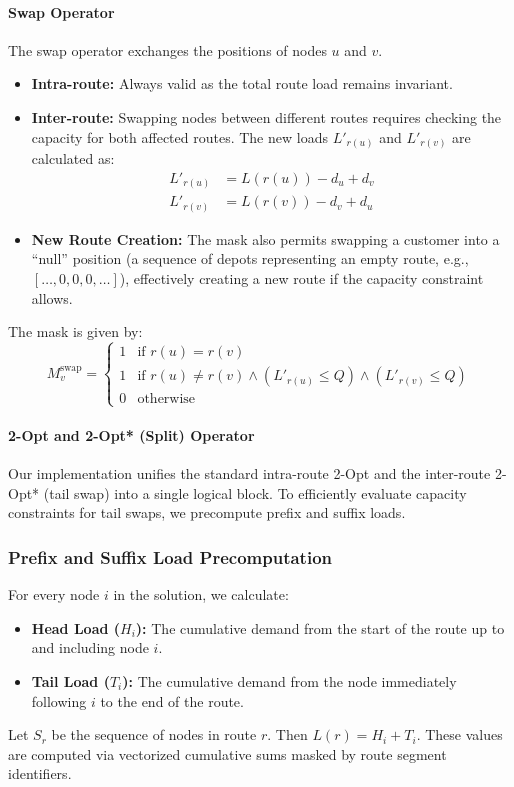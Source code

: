 \documentclass[letterpaper]{article} %
\begin{document}
\paragraph{Swap Operator}
The swap operator exchanges the positions of nodes $u$ and $v$.
\begin{itemize}
    \item \textbf{Intra-route:} Always valid as the total route load remains invariant.
    \item \textbf{Inter-route:} Swapping nodes between different routes requires checking the capacity for both affected routes. The new loads $L'_{r(u)}$ and $L'_{r(v)}$ are calculated as:
    \begin{align}
        L'_{r(u)} &= L(r(u)) - d_u + d_v \\
        L'_{r(v)} &= L(r(v)) - d_v + d_u
    \end{align}
    \item \textbf{New Route Creation:} The mask also permits swapping a customer into a ``null'' position (a sequence of depots representing an empty route, e.g., $[\dots, 0, 0, 0, \dots]$), effectively creating a new route if the capacity constraint allows.
\end{itemize}
The mask is given by:
\begin{equation}
    M_v^{\text{swap}} =
    \begin{cases}
        1 & \text{if } r(u) = r(v) \\
        1 & \text{if } r(u) \neq r(v) \land (L'_{r(u)} \leq Q) \land (L'_{r(v)} \leq Q) \\
        0 & \text{otherwise}
    \end{cases}
\end{equation}

\paragraph{2-Opt and 2-Opt* (Split) Operator}
Our implementation unifies the standard intra-route 2-Opt and the inter-route 2-Opt* (tail swap) into a single logical block. To efficiently evaluate capacity constraints for tail swaps, we precompute prefix and suffix loads.

\subsubsection{Prefix and Suffix Load Precomputation}
For every node $i$ in the solution, we calculate:
\begin{itemize}
    \item \textbf{Head Load ($H_i$):} The cumulative demand from the start of the route up to and including node $i$.
    \item \textbf{Tail Load ($T_i$):} The cumulative demand from the node immediately following $i$ to the end of the route.
\end{itemize}
Let $S_r$ be the sequence of nodes in route $r$. Then $L(r) = H_i + T_i$. These values are computed via vectorized cumulative sums masked by route segment identifiers.
\end{document}
